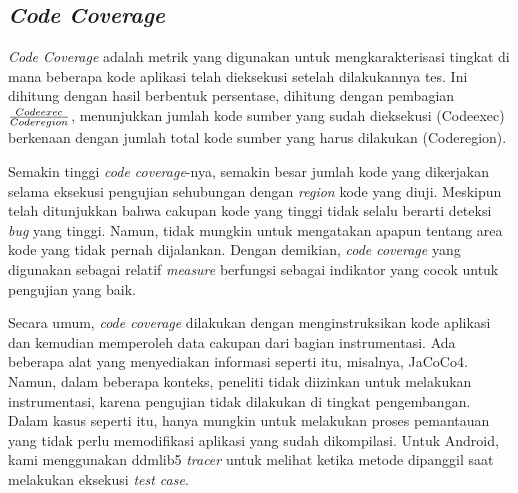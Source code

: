 \documentclass[a4paper,twoside]{article}
\begin{document}
\begin{enumerate}
\section*{\textit{Code Coverage}}
\textit{Code Coverage} adalah metrik yang digunakan untuk mengkarakterisasi tingkat di mana beberapa  kode aplikasi telah dieksekusi setelah dilakukannya tes. Ini dihitung dengan hasil berbentuk persentase, dihitung dengan pembagian $\frac{Code{\tiny exec}}{Code{\tiny region}}$, menunjukkan jumlah kode sumber yang sudah dieksekusi (Code{\tiny exec}) berkenaan dengan jumlah total kode sumber yang harus dilakukan (Code{\tiny region}).

Semakin tinggi \textit{code coverage}-nya, semakin besar jumlah kode yang dikerjakan selama eksekusi pengujian sehubungan dengan \textit{region} kode yang diuji. Meskipun telah ditunjukkan bahwa cakupan kode yang tinggi tidak selalu berarti deteksi \textit{bug} yang tinggi. Namun, tidak mungkin untuk mengatakan apapun tentang area kode yang tidak pernah dijalankan. Dengan demikian, \textit{code coverage} yang digunakan sebagai relatif \textit{measure} berfungsi sebagai indikator yang cocok untuk pengujian yang baik.

Secara umum, \textit{code coverage} dilakukan dengan menginstruksikan kode aplikasi dan kemudian memperoleh data cakupan dari bagian instrumentasi. Ada beberapa alat yang menyediakan informasi seperti itu, misalnya, JaCoCo4. Namun, dalam beberapa konteks, peneliti tidak diizinkan untuk melakukan instrumentasi, karena pengujian tidak dilakukan di tingkat pengembangan. Dalam kasus seperti itu, hanya mungkin untuk melakukan proses pemantauan yang tidak perlu memodifikasi aplikasi yang sudah dikompilasi. Untuk Android, kami menggunakan ddmlib5 \textit{tracer} untuk melihat ketika metode dipanggil saat melakukan eksekusi \textit{test case}.


\end{enumerate}
\end{document}
